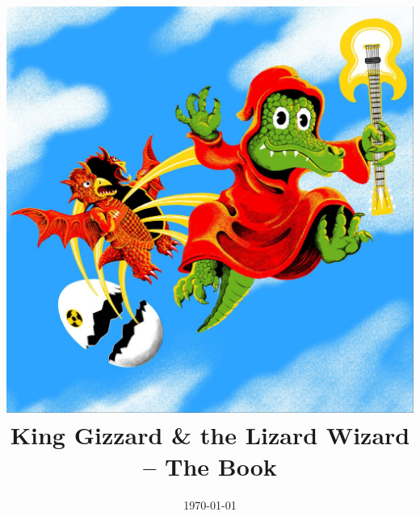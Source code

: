 \documentclass[a4paper,11pt,titlepage]{report}
\title{\centering\includegraphics[width=0.8\linewidth]{cover-image.jpg}\\[1cm]%
King Gizzard \& the Lizard Wizard -- The Book}
\date{\today}
\begin{document}
\newcommand{\album}[1]{\chapter{#1}}
\newcommand{\song}[1]{\section{#1}\index{#1}}
\newcommand{\note}[1]{\emph{#1}\newline}

\maketitle

\tableofcontents



\clearpage
\printindex 
\end{document}
